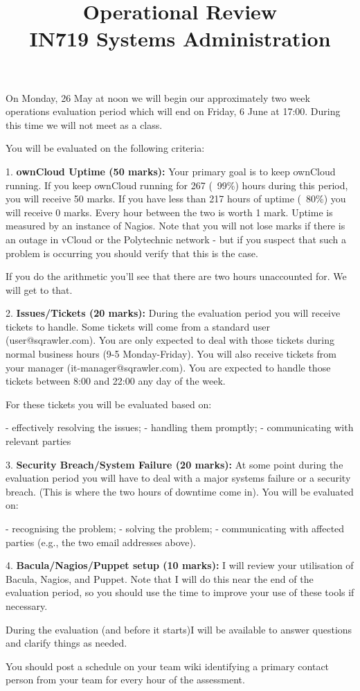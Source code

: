 \documentclass{article}   	%
\title{Operational Review\\ IN719 Systems Administration}
\date{}							%
\begin{document}
\maketitle


On Monday, 26 May at noon we will begin our approximately two week operations evaluation period which will end on Friday, 6 June at 17:00.  During this time we will not meet as a class.

You will be evaluated on the following criteria:

1.  \textbf{ownCloud Uptime (50 marks):}  Your primary goal is to keep ownCloud running.  If you keep ownCloud running for 267 (~99\%) hours during this period, you will receive 50 marks.  If you have less than 217 hours of uptime (~80\%) you will receive 0 marks.  Every hour between the two is worth 1 mark.  Uptime is measured by an instance of Nagios.  Note that you will not lose marks if there is an outage in vCloud or the Polytechnic network - but if you suspect that such a problem is occurring you should verify that this is the case.

If you do the arithmetic you'll see that there are two hours unaccounted for.  We will get to that.

2.  \textbf{Issues/Tickets (20 marks):}  During the evaluation period you will receive tickets to handle.  Some tickets will come from a standard user (user@sqrawler.com).  You are only expected to deal with those tickets during normal business hours (9-5 Monday-Friday).  You will also receive tickets from your manager (it-manager@sqrawler.com).  You are expected to handle those tickets between 8:00 and 22:00 any day of the week.  

For these tickets you will be evaluated based on:

   - effectively resolving the issues;
   - handling them promptly;
   - communicating with relevant parties

3.  \textbf{Security Breach/System Failure (20 marks):}  At some point during the evaluation period you will have to deal with a major systems failure or a security breach.  (This is where the two hours of downtime come in).  You will be evaluated on:

  - recognising the problem;
  - solving the problem;
  - communicating with affected parties (e.g., the two email addresses above).

4.  \textbf{Bacula/Nagios/Puppet setup (10 marks):} I will review your utilisation of Bacula, Nagios, and Puppet.  Note that I will do this near the end of the evaluation period, so you should use the time to improve your use of these tools if necessary.

During the evaluation (and before it starts)I will be available to answer questions and clarify things as needed.

You should post a schedule on your team wiki identifying a primary contact person from your team for every hour of the assessment.
\end{document}
